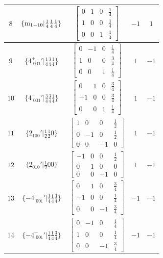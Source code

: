 \documentclass[fleqn,8pt]{jsarticle}
\begin{document}
\begin{longtable}{ccccc}
$ 8 $ & $ \{{\rm m}_{1-10}|\frac{1}{4} \frac{1}{4} \frac{1}{4}\} $ & $ \begin{bmatrix} 0 & 1 & 0 & \frac{1}{4} \\ 1 & 0 & 0 & \frac{1}{4} \\ 0 & 0 & 1 & \frac{1}{4} \end{bmatrix} $ & $ -1 $ & $ 1 $ \\ \hline
$ 9 $ & $ \{4^{+}_{\,\,001}{}'|\frac{1}{4} \frac{3}{4} \frac{1}{4}\} $ & $ \begin{bmatrix} 0 & -1 & 0 & \frac{1}{4} \\ 1 & 0 & 0 & \frac{3}{4} \\ 0 & 0 & 1 & \frac{1}{4} \end{bmatrix} $ & $ 1 $ & $ -1 $ \\ \hline
$ 10 $ & $ \{4^{-}_{\,\,001}{}'|\frac{3}{4} \frac{3}{4} \frac{1}{4}\} $ & $ \begin{bmatrix} 0 & 1 & 0 & \frac{3}{4} \\ -1 & 0 & 0 & \frac{3}{4} \\ 0 & 0 & 1 & \frac{1}{4} \end{bmatrix} $ & $ 1 $ & $ -1 $ \\ \hline
$ 11 $ & $ \{2{}_{100}{}'|\frac{1}{2} \frac{1}{2} 0\} $ & $ \begin{bmatrix} 1 & 0 & 0 & \frac{1}{2} \\ 0 & -1 & 0 & \frac{1}{2} \\ 0 & 0 & -1 & 0 \end{bmatrix} $ & $ 1 $ & $ -1 $ \\ \hline
$ 12 $ & $ \{2{}_{010}{}'|\frac{1}{2} 0 0\} $ & $ \begin{bmatrix} -1 & 0 & 0 & \frac{1}{2} \\ 0 & 1 & 0 & 0 \\ 0 & 0 & -1 & 0 \end{bmatrix} $ & $ 1 $ & $ -1 $ \\ \hline
$ 13 $ & $ \{-4^{+}_{\,\,001}{}'|\frac{3}{4} \frac{1}{4} \frac{3}{4}\} $ & $ \begin{bmatrix} 0 & 1 & 0 & \frac{3}{4} \\ -1 & 0 & 0 & \frac{1}{4} \\ 0 & 0 & -1 & \frac{3}{4} \end{bmatrix} $ & $ -1 $ & $ -1 $ \\ \hline
$ 14 $ & $ \{-4^{-}_{\,\,001}{}'|\frac{1}{4} \frac{1}{4} \frac{3}{4}\} $ & $ \begin{bmatrix} 0 & -1 & 0 & \frac{1}{4} \\ 1 & 0 & 0 & \frac{1}{4} \\ 0 & 0 & -1 & \frac{3}{4} \end{bmatrix} $ & $ -1 $ & $ -1 $ \\ \hline

\end{longtable}
\end{document}
